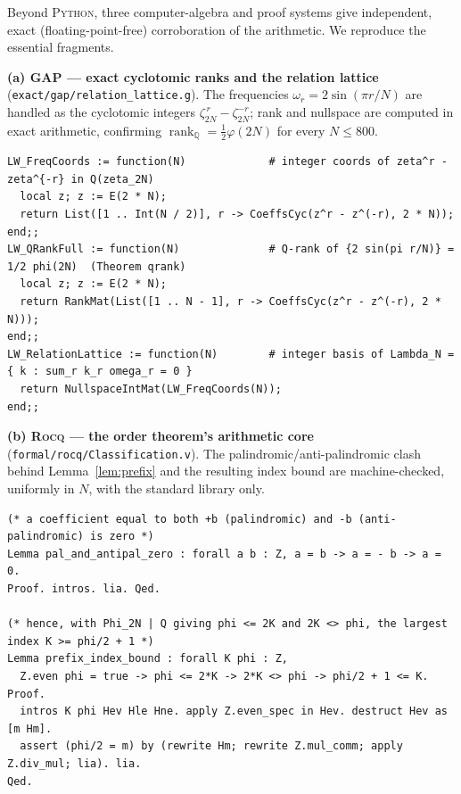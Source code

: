 \documentclass[11pt,reqno]{amsart}
\theoremstyle{plain}
\theoremstyle{definition}
\newcommand{\Q}{\mathbb{Q}}
\begin{document}
\medskip\noindent Beyond \textsc{Python}, three computer-algebra and proof systems give independent,
exact (floating-point-free) corroboration of the arithmetic. We reproduce the essential fragments.

\smallskip\noindent\textbf{(a) \textsc{GAP} --- exact cyclotomic ranks and the relation lattice}
(\texttt{exact/gap/relation\_lattice.g}). The frequencies $\omega_r=2\sin(\pi r/N)$ are handled as the
cyclotomic integers $\zeta_{2N}^{\,r}-\zeta_{2N}^{-r}$; rank and nullspace are computed in exact
arithmetic, confirming $\operatorname{rank}_\Q=\tfrac12\varphi(2N)$ for every $N\le800$.
\begin{lstlisting}[language=GAPlang]
LW_FreqCoords := function(N)             # integer coords of zeta^r - zeta^{-r} in Q(zeta_2N)
  local z; z := E(2 * N);
  return List([1 .. Int(N / 2)], r -> CoeffsCyc(z^r - z^(-r), 2 * N));
end;;
LW_QRankFull := function(N)              # Q-rank of {2 sin(pi r/N)} = 1/2 phi(2N)  (Theorem qrank)
  local z; z := E(2 * N);
  return RankMat(List([1 .. N - 1], r -> CoeffsCyc(z^r - z^(-r), 2 * N)));
end;;
LW_RelationLattice := function(N)        # integer basis of Lambda_N = { k : sum_r k_r omega_r = 0 }
  return NullspaceIntMat(LW_FreqCoords(N));
end;;
\end{lstlisting}

\smallskip\noindent\textbf{(b) \textsc{Rocq} --- the order theorem's arithmetic core}
(\texttt{formal/rocq/Classification.v}). The palindromic/anti-palindromic clash behind
Lemma~\ref{lem:prefix} and the resulting index bound are machine-checked, uniformly in $N$, with the
standard library only.
\begin{lstlisting}[language=Rocq]
(* a coefficient equal to both +b (palindromic) and -b (anti-palindromic) is zero *)
Lemma pal_and_antipal_zero : forall a b : Z, a = b -> a = - b -> a = 0.
Proof. intros. lia. Qed.

(* hence, with Phi_2N | Q giving phi <= 2K and 2K <> phi, the largest index K >= phi/2 + 1 *)
Lemma prefix_index_bound : forall K phi : Z,
  Z.even phi = true -> phi <= 2*K -> 2*K <> phi -> phi/2 + 1 <= K.
Proof.
  intros K phi Hev Hle Hne. apply Z.even_spec in Hev. destruct Hev as [m Hm].
  assert (phi/2 = m) by (rewrite Hm; rewrite Z.mul_comm; apply Z.div_mul; lia). lia.
Qed.
\end{lstlisting}
\end{document}
